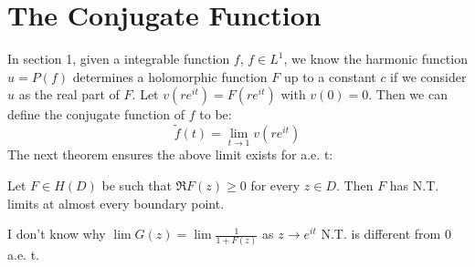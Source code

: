 % 
\section{The Conjugate Function}
In section 1, given a integrable function $f$, $f\in L^1$, we know the harmonic function $u=P(f)$ determines a holomorphic function $F$ up to a constant $c$ if we consider $u$
as the real part of $F$. Let $v(re^{it})=F(re^{it})$ with $v(0)=0$. Then we can define the conjugate function of $f$ to be:
\begin{equation*}
    \tilde{f}(t)=\lim_{t\to 1}{v(re^{it})}
\end{equation*}
The next theorem ensures the above limit exists for a.e. t:
\begin{theorem}
    Let $F\in H(D)$ be such that $\Re{F(z)}\geq 0$ for every $z\in D$. Then $F$ has N.T. limits at almost every boundary point.
\end{theorem}
\begin{remark}
    {\color{blue}I don't know why $\lim{G(z)}=\lim{\frac{1}{1+F(z)}}$ as $z\to e^{it}$ N.T. is different from 0 a.e. t}.
\end{remark}
